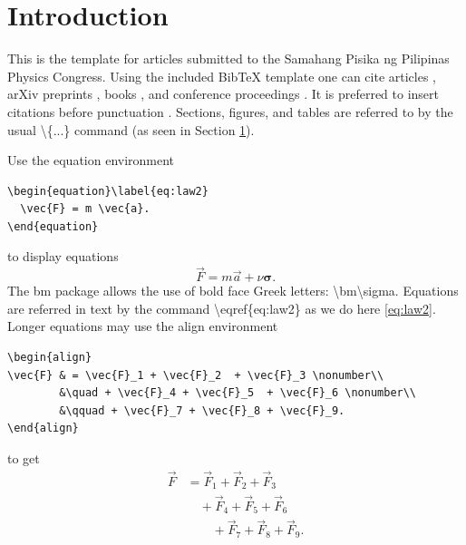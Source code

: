 \documentclass[10pt,a4paper,twoside]{article}
\begin{document}
\maketitle
\thispagestyle{titlestyle}


\section{Introduction}\label{sec:intro}
This is the template for articles submitted to the Samahang Pisika ng Pilipinas Physics Congress. Using the included BibTeX template one can cite articles \cite{articlekey}, arXiv preprints \cite{preprintkey}, books \cite{bookkey}, and conference proceedings \cite{proceedingskey,proceedingskey1,proceedingskey2}. It is preferred to insert citations before punctuation \cite{articlekey,preprintkey}. Sections, figures, and tables are referred to by the usual \textbackslash{}\{...\} command (as seen in Section \ref{sec:intro}).

Use the equation environment
\begin{verbatim}
\begin{equation}\label{eq:law2}
  \vec{F} = m \vec{a}.
\end{equation}	 
\end{verbatim}
to display equations
\begin{equation}\label{eq:law2}
		\vec{F} = m \vec{a} + \nu \bm\sigma.
\end{equation}
The {\ttfamily bm} package allows the use of bold face Greek letters: \textbackslash {\ttfamily bm}\textbackslash {\ttfamily sigma}. Equations are referred in text by the command \textbackslash{\ttfamily eqref}\{{\ttfamily eq:law2}\} as we do here \eqref{eq:law2}.
Longer equations may use the align environment
\begin{verbatim}
\begin{align}
\vec{F} & = \vec{F}_1 + \vec{F}_2  + \vec{F}_3 \nonumber\\
        &\quad + \vec{F}_4 + \vec{F}_5  + \vec{F}_6 \nonumber\\
        &\qquad + \vec{F}_7 + \vec{F}_8 + \vec{F}_9.
\end{align}
\end{verbatim}
to get
\begin{align}
\vec{F} & = \vec{F}_1 +  \vec{F}_2  +  \vec{F}_3  \nonumber \\
 &\quad + \vec{F}_4 +  \vec{F}_5  +  \vec{F}_6  \nonumber \\
 &\qquad + \vec{F}_7 + \vec{F}_8 + \vec{F}_9.
\end{align}
\end{document}

